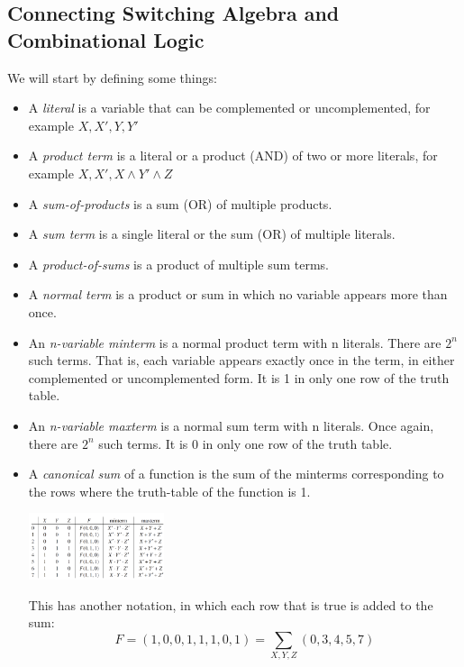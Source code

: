 \documentclass[nobib]{tufte-handout}
\begin{document}
\subsection{Connecting Switching Algebra and Combinational Logic}
We will start by defining some things:\\
\begin{itemize}
    \item A \textit{literal} is a variable that can be complemented or uncomplemented,
          for example $X,X',Y,Y'$
    \item A \textit{product term} is a literal or a product (AND) of two or more
          literals, for example $X,X',X\land Y'\land Z$
    \item A \textit{sum-of-products} is a sum (OR) of multiple products.
    \item A \textit{sum term} is a single literal or the sum (OR) of multiple literals.
    \item A \textit{product-of-sums} is a product of multiple sum terms.
    \item A \textit{normal term} is a product or sum in which no variable appears more
          than once.
    \item An \textit{n-variable minterm} is a normal product term with n literals. There
          are $2^n$ such terms. That is, each variable appears exactly once in the term,
          in either complemented or uncomplemented form. It is 1 in only one row of the
          truth table.
    \item An \textit{n-variable maxterm} is a normal sum term with n literals. Once
          again, there are $2^n$ such terms. It is 0 in only one row of the truth table.
    \item A \textit{canonical sum} of a function is the sum of the minterms corresponding
          to the rows where the truth-table of the function is 1.
          \begin{center}
              \includegraphics[width = 150px]{images/minterm_maxterm_func.png}
          \end{center}
          This has another notation, in which each row that is true is added to the sum:
          \begin{equation*}
              F = (1,0,0,1,1,1,0,1)=\sum_{X,Y,Z}(0,3,4,5,7)

\end{equation*}
\end{itemize}
\end{document}
